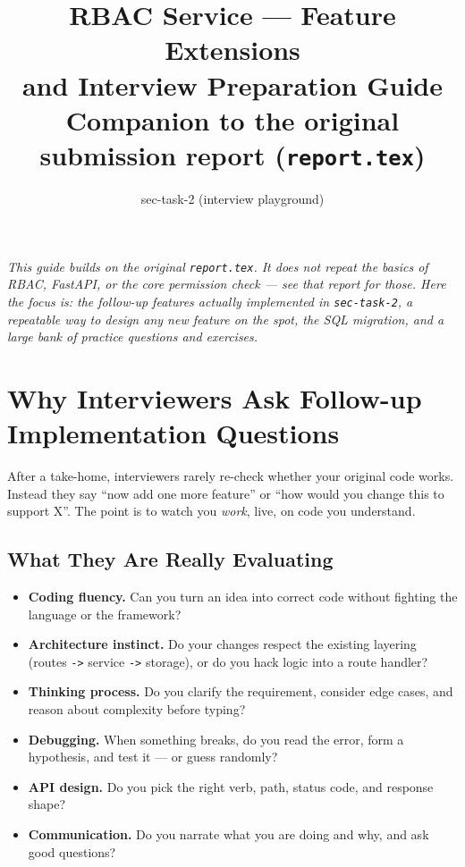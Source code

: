\documentclass[11pt,a4paper]{report}
\title{\textbf{RBAC Service --- Feature Extensions \\ and Interview Preparation Guide}\\[6pt]
\large Companion to the original submission report (\texttt{report.tex})}
\author{sec-task-2 (interview playground)}
\date{}
\begin{document}
\maketitle

\begin{center}
\textit{This guide builds on the original \texttt{report.tex}. It does not repeat
the basics of RBAC, FastAPI, or the core permission check --- see that report
for those. Here the focus is: the follow-up features actually implemented in
\texttt{sec-task-2}, a repeatable way to design any new feature on the spot, the
SQL migration, and a large bank of practice questions and exercises.}
\end{center}

\tableofcontents

\chapter{Why Interviewers Ask Follow-up Implementation Questions}

After a take-home, interviewers rarely re-check whether your original code works.
Instead they say ``now add one more feature'' or ``how would you change this to
support X''. The point is to watch you \emph{work}, live, on code you understand.

\section{What They Are Really Evaluating}

\begin{itemize}[leftmargin=1.4em]
  \item \textbf{Coding fluency.} Can you turn an idea into correct code without
        fighting the language or the framework?
  \item \textbf{Architecture instinct.} Do your changes respect the existing
        layering (routes \texttt{->} service \texttt{->} storage), or do you hack
        logic into a route handler?
  \item \textbf{Thinking process.} Do you clarify the requirement, consider edge
        cases, and reason about complexity before typing?
  \item \textbf{Debugging.} When something breaks, do you read the error, form a
        hypothesis, and test it --- or guess randomly?
  \item \textbf{API design.} Do you pick the right verb, path, status code, and
        response shape?
  \item \textbf{Communication.} Do you narrate what you are doing and why, and ask
        good questions?
\end{itemize}
\end{document}
